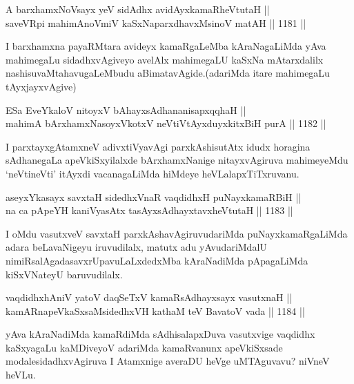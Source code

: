 
\begin{shl}
A barxhamxNoV\s sayx yeV sidAdhx avidAyxkamaRheVtutaH || \\
saveVR\s pi mahimAnoV\s miV kaSxNaparxdhavxMsinoV matAH \hfill || 1181 ||  
\end{shl}

\begin{artha}
I barxhamxna payaRMtara avideyx kamaRgaLeMba kAraNagaLiMda yAva mahimegaLu sidadhxvAgiveyo avelAlx mahimegaLU kaSxNa mAtarxdalilx nashisuvaMtahavugaLeMbudu aBimatavAgide.(adariMda itare mahimegaLu tAyxjayxvAgive)
\end{artha}

\begin{shl}
ESa EveYkaloV nitoyxV bAhayxsAdhananisapxqqhaH || \\
mahimA bArxhamxNasoyxVkotxV neVtiVtAyxduyxkitxBiH purA \hfill || 1182 ||  
\end{shl}

\begin{artha}
I parxtayxgAtamxneV adivxtiVyavAgi parxkAshisutAtx idudx horagina sAdhanegaLa apeVkiSxyilalxde bArxhamxNanige nitayxvAgiruva mahimeyeMdu `neVtineVti' itAyxdi vacanagaLiMda hiMdeye heVLalapxTiTxruvanu.
\end{artha}

\begin{shl}
aseyxYkasayx savxtaH sidedhxVnaR vaqdidhxH puNayxkamaRBiH || \\
na ca pApeYH kaniVyasAtx tasAyxsAdhayxtavxheVtutaH \hfill || 1183 ||  
\end{shl}

\begin{artha}
I oMdu vasutxveV savxtaH parxkAshavAgiruvudariMda puNayxkamaRgaLiMda adara beLavaNigeyu iruvudilalx, matutx adu yAvudariMdalU nimiRsalAgadasavxrUpavuLaLxdedxMba kAraNadiMda pApagaLiMda kiSxVNateyU baruvudilalx.
\end{artha}


\begin{shl}
vaqdidhxhAniV yatoV daqSeTxV kamaRsAdhayxsayx vasutxnaH || \\
kamARnapeVkaSxsaMsidedhxVH kathaM teV BavatoV vada \hfill || 1184 ||  
\end{shl}

\begin{artha}
yAva kAraNadiMda kamaRdiMda sAdhisalapxDuva vasutxvige vaqdidhx kaSxyagaLu kaMDiveyoV adariMda kamaRvanunx apeVkiSxsade modalesidadhxvAgiruva I Atamxnige averaDU heVge uMTAguvavu? niVneV heVLu.
\end{artha}

